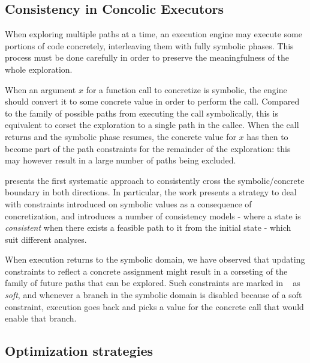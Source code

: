 \subsection{Consistency in Concolic Executors} 

When exploring multiple paths at a time, an execution engine may execute some portions of code concretely, interleaving them with fully symbolic phases. This process must be done carefully in order to preserve the meaningfulness of the whole exploration.

When an argument $x$ for a function call to concretize is symbolic, the engine should convert it to some concrete value in order to perform the call. Compared to the family of possible paths from executing the call symbolically, this is equivalent to corset the exploration to a single path in the callee. When the call returns and the symbolic phase resumes, the concrete value for $x$ has then to become part of the path constraints for the remainder of the exploration: this may however result in a large number of paths being excluded.

\cite{CKC-TOCS12} presents the first systematic approach to consistently cross the symbolic/concrete boundary in both directions. In particular, the work presents a strategy to deal with constraints introduced on symbolic values as a consequence of concretization, and introduces a number of consistency models - where a state is {\em consistent} when there exists a feasible path to it from the initial state - which suit different analyses.

When execution returns to the symbolic domain, we have observed that updating constraints to reflect a concrete assignment might result in a corseting of the family of future paths that can be explored. Such constraints are marked in ~\cite{CKC-TOCS12} as {\em soft}, and whenever a branch in the symbolic domain is disabled because of a soft constraint, execution goes back and picks a value for the concrete call that would enable that branch.

\subsection{Optimization strategies} 
\label{function-summaries}


